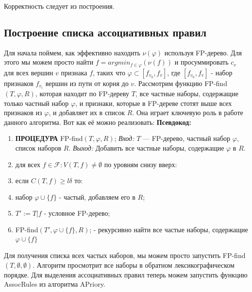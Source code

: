 Корректность следует из построения.

\subsection{Построение списка ассоциативных правил}

Для начала поймем, как эффективно находить $\nu(\varphi)$ используя FP-дерево. Для этого мы можем просто найти $f =argmin_{f \in \varphi} (\nu(f))$ и просуммировать $c_v$ для всех вершин $v$ признака $f$, таких что $\varphi \subset [f_{v_0}, f_{v}]$, где $[f_{v_0}, f_{v}]$ - набор признаков $f_{v_i}$ вершин из пути от корня до $v$.
\newline\newline
Рассмотрим функцию FP-find$(T,\varphi,R)$, которая находит по FP-дереву $T$, все частные наборы, содержащие только частный набор $\varphi$, и признаки, которые в FP-дереве стотят выше всех признаков из $\varphi$, и добавляет их в список $R$. Она играет ключевую роль в работе данного алгоритма. Вот как её можно реализовать:
\newline\newline
\textbf{Псевдокод:}

\noindent\hrulefill %
\begin{enumerate}
    \item \textbf{ПРОЦЕДУРА} FP-find$(T,\varphi,R)$;
    \newline
    \quad \textit{Вход:} $T$ — FP-дерево, частный набор $\varphi$, список наборов $R$.
    \newline
    \quad \textit{Выход:} Добавить все частные наборы, содержащие $\varphi$ в $R$.
    \item \quad для всех $f \in \mathcal{F} : V(T,f) \neq \emptyset$ по уровням снизу вверх:
    \item \quad \quad если $C(T,f) \geq l\delta$ то:
    \item \quad \quad \quad набор $\varphi \cup \{f\}$ - частый, добавляем его в $R$;
    \item \quad \quad \quad $T':=T|f$ - условное FP-дерево;
    \item \quad \quad \quad FP-find$(T',\varphi \cup \{f\},R)$; - рекурсивно найти все частые наборы, содержащие $\varphi \cup \{f\}$
\end{enumerate}
\noindent\hrulefill %
\newline\newline
Для получения списка всех частых наборов, мы можем просто запустить FP-find$(T,\emptyset,\emptyset)$. Алгоритм просмотрит все наборы в обратном лексикографическом порядке. Для выделения ассоциативных правил теперь можем запустить функцию AssocRules из алгоритма APriory.

